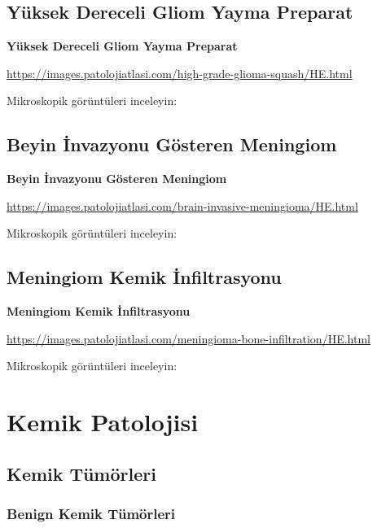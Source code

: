 \documentclass[
  letterpaper,
  DIV=11,
  numbers=noendperiod]{scrreprt}
\begin{document}
\hypertarget{yuxfcksek-dereceli-gliom-yayma-preparat}{%
\chapter{Yüksek Dereceli Gliom Yayma
Preparat}\label{yuxfcksek-dereceli-gliom-yayma-preparat}}

\textbf{Yüksek Dereceli Gliom Yayma Preparat}

\url{https://images.patolojiatlasi.com/high-grade-glioma-squash/HE.html}

Mikroskopik görüntüleri inceleyin:

\hypertarget{beyin-invazyonu-guxf6steren-meningiom}{%
\chapter{Beyin İnvazyonu Gösteren
Meningiom}\label{beyin-invazyonu-guxf6steren-meningiom}}

\textbf{Beyin İnvazyonu Gösteren Meningiom}

\url{https://images.patolojiatlasi.com/brain-invasive-meningioma/HE.html}

Mikroskopik görüntüleri inceleyin:

\hypertarget{meningiom-kemik-infiltrasyonu}{%
\chapter{Meningiom Kemik
İnfiltrasyonu}\label{meningiom-kemik-infiltrasyonu}}

\textbf{Meningiom Kemik İnfiltrasyonu}

\url{https://images.patolojiatlasi.com/meningioma-bone-infiltration/HE.html}

Mikroskopik görüntüleri inceleyin:

\part{Kemik Patolojisi}

\hypertarget{kemik-tuxfcmuxf6rleri}{%
\chapter{Kemik Tümörleri}\label{kemik-tuxfcmuxf6rleri}}

\hypertarget{benign-kemik-tuxfcmuxf6rleri}{%
\section{Benign Kemik Tümörleri}\label{benign-kemik-tuxfcmuxf6rleri}}
\end{document}
